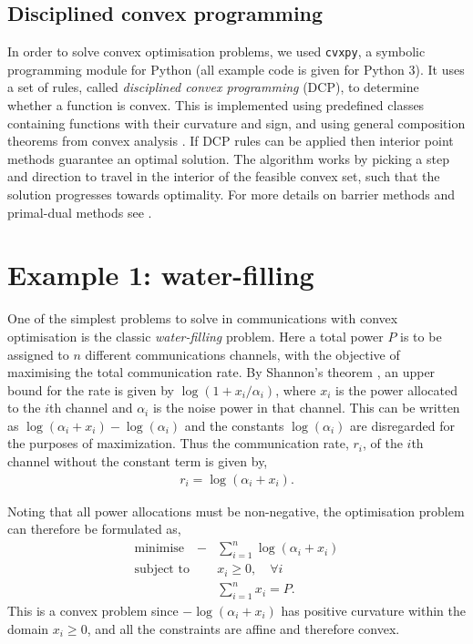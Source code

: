 \documentclass[twocolumn,secnumarabic,amssymb, nobibnotes, aps, prl,superscriptaddress]{revtex4-1}
\begin{document}
\subsection{Disciplined convex programming}
\noindent In order to solve convex optimisation problems, we used \texttt{cvxpy}, a symbolic programming module for Python \cite{cvxpy} (all example code is given for Python 3). It uses a set of rules, called \textit{disciplined convex programming} (DCP), to determine whether a function is convex. This is implemented using predefined classes containing functions with their curvature and sign, and using general composition theorems from convex analysis \cite{dcp}. If DCP rules can be applied then interior point methods guarantee an optimal solution. 
 The algorithm works by picking a step and direction to travel in the interior of the feasible convex set, such that the solution progresses towards optimality. For more details on barrier methods and primal-dual methods see \citep[p.561]{cvxpybook}.
 
\section{Example 1: water-filling}
 
\noindent{}One of the simplest problems to solve in communications with convex optimisation is the classic \textit{water-filling} problem.  Here a total power $P$ is to be assigned to $n$ different communications channels, with the objective of maximising the total communication rate.  By Shannon's theorem \citep[p.245]{cvxpybook}, an upper bound for the rate is given by $\log(1+x_i/\alpha_i)$, where $x_i$ is the power allocated to the $i$th channel and $\alpha_i$ is the noise power in that channel. This can be written as $\log(\alpha_i+x_i)-\log(\alpha_i)$ and the constants $\log(\alpha_i)$ are disregarded for the purposes of maximization. Thus the communication rate, $r_i$, of the $i$th channel without the constant term is given by,
 \begin{align}
  r_i = \log(\alpha_i+x_i).
 \end{align}

 
Noting that all power allocations must be non-negative, the optimisation problem can therefore be formulated as,
 \begin{align}
\text{minimise} \quad  -&\sum_{i=1}^{n} \log(\alpha_i+x_i) \nonumber \\
\text{subject to} \quad &x_i \geqslant 0, \quad \forall i \nonumber \\
&\sum_{i=1}^{n}x_i = P.
 \end{align}
This is a convex problem since $-\log(\alpha_i+x_i)$ has positive curvature within the domain $x_i \geqslant 0$, and all the constraints are affine and therefore convex.
\end{document}
